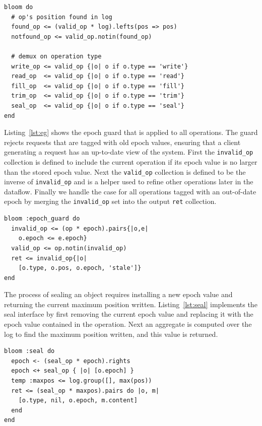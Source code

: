 \documentclass[10pt,twocolumn]{article}
\begin{document}
\begin{lstlisting}[caption={Setup}, label=lst:setup]
bloom do
  # op's position found in log
  found_op <= (valid_op * log).lefts(pos => pos)
  notfound_op <= valid_op.notin(found_op)

  # demux on operation type
  write_op <= valid_op {|o| o if o.type == 'write'}
  read_op  <= valid_op {|o| o if o.type == 'read'}
  fill_op  <= valid_op {|o| o if o.type == 'fill'}
  trim_op  <= valid_op {|o| o if o.type == 'trim'}
  seal_op  <= valid_op {|o| o if o.type == 'seal'}
end
\end{lstlisting}

Listing~\ref{lst:eg} shows the epoch guard that is applied to all operations.
The guard rejects requests that are tagged with old epoch values, ensuring that
a client generating a request has an up-to-date view of the system.  First the
\texttt{invalid\_op} collection is defined to include the current operation if
its epoch value is no larger than the stored epoch value. Next the
\texttt{valid\_op} collection is defined to be the inverse of
\texttt{invalid\_op} and is a helper used to refine other operations later in
the dataflow. Finally we handle the case for all operations tagged with an
out-of-date epoch by merging the \texttt{invalid\_op} set into the output
\texttt{ret} collection.

\begin{lstlisting}[caption={Epoch Guard}, label=lst:eg]
bloom :epoch_guard do
  invalid_op <= (op * epoch).pairs{|o,e|
    o.epoch <= e.epoch}
  valid_op <= op.notin(invalid_op)
  ret <= invalid_op{|o|
    [o.type, o.pos, o.epoch, 'stale']}
end
\end{lstlisting}

The process of sealing an object requires installing a new epoch value and
returning the current maximum position written. Listing~\ref{lst:seal} 
implements the seal interface by first removing the current epoch value and
replacing it with the epoch value contained in the operation. Next an aggregate
is computed over the log to find the maximum position written, and this value
is returned.

\begin{lstlisting}[caption={Seal}, label=lst:seal]
bloom :seal do
  epoch <- (seal_op * epoch).rights
  epoch <+ seal_op { |o| [o.epoch] }
  temp :maxpos <= log.group([], max(pos))
  ret <= (seal_op * maxpos).pairs do |o, m|
    [o.type, nil, o.epoch, m.content]
  end
end
\end{lstlisting}
\end{document}
